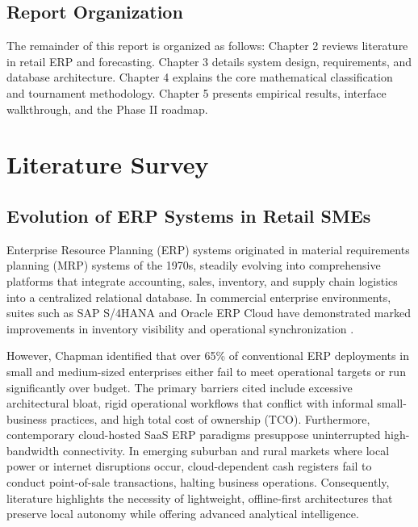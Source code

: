 \section{Report Organization}
The remainder of this report is organized as follows: Chapter 2 reviews literature in retail ERP and forecasting. Chapter 3 details system design, requirements, and database architecture. Chapter 4 explains the core mathematical classification and tournament methodology. Chapter 5 presents empirical results, interface walkthrough, and the Phase II roadmap.


\clearpage
\chapter{Literature Survey}
\section{Evolution of ERP Systems in Retail SMEs}
Enterprise Resource Planning (ERP) systems originated in material requirements planning (MRP) systems of the 1970s, steadily evolving into comprehensive platforms that integrate accounting, sales, inventory, and supply chain logistics into a centralized relational database. In commercial enterprise environments, suites such as SAP S/4HANA and Oracle ERP Cloud have demonstrated marked improvements in inventory visibility and operational synchronization \cite{10}. 

However, Chapman \cite{10} identified that over 65\% of conventional ERP deployments in small and medium-sized enterprises either fail to meet operational targets or run significantly over budget. The primary barriers cited include excessive architectural bloat, rigid operational workflows that conflict with informal small-business practices, and high total cost of ownership (TCO). Furthermore, contemporary cloud-hosted SaaS ERP paradigms presuppose uninterrupted high-bandwidth connectivity. In emerging suburban and rural markets where local power or internet disruptions occur, cloud-dependent cash registers fail to conduct point-of-sale transactions, halting business operations. Consequently, literature highlights the necessity of lightweight, offline-first architectures that preserve local autonomy while offering advanced analytical intelligence.

